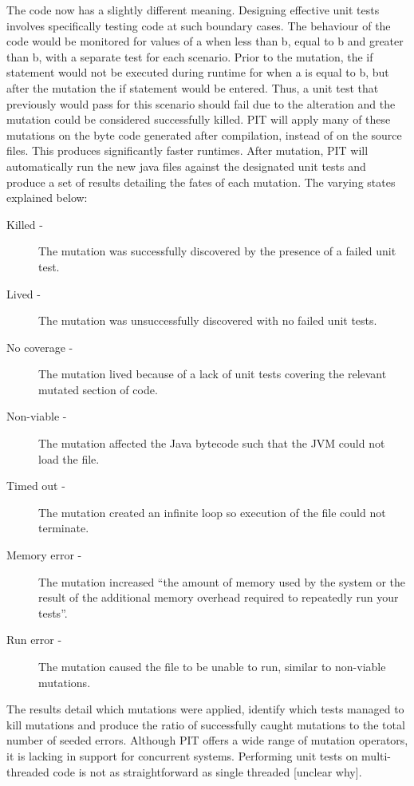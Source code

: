 \documentclass[a4paper,12pt]{article}
\begin{document}
The code now has a slightly different meaning. Designing effective unit tests involves specifically testing code at such boundary cases. The behaviour of the code would be monitored for values of a when less than b, equal to b and greater than b, with a separate test for each scenario. Prior to the mutation, the if statement would not be executed during runtime for when a is equal to b, but after the mutation the if statement would be entered. Thus, a unit test that previously would pass for this scenario should fail due to the alteration and the mutation could be considered successfully killed. PIT will apply many of these mutations on the byte code generated after compilation, instead of on the source files. This produces significantly faster runtimes. After mutation, PIT will automatically run the new java files against the designated unit tests and produce a set of results detailing the fates of each mutation. The varying states explained below:

\begin{description}
    \item[Killed - ]The mutation was successfully discovered by the presence of a failed unit test.
    \item[Lived -]The mutation was unsuccessfully discovered with no failed unit tests. 
    \item[No coverage -]The mutation lived because of a lack of unit tests covering the relevant mutated section of code. 
    \item[Non-viable -]The mutation affected the Java bytecode such that the JVM could not load the file.
    \item[Timed out -]The mutation created an infinite loop so execution of the file could not terminate. 
    \item[Memory error -]The mutation increased “the amount of memory used by the system or the result of the additional memory overhead required to repeatedly run your tests”.
    \item[Run error -]The mutation caused the file to be unable to run, similar to non-viable mutations.
\end{description}

The results detail which mutations were applied, identify which tests managed to kill mutations and produce the ratio of successfully caught mutations to the total number of seeded errors. Although PIT offers a wide range of mutation operators, it is lacking in support for concurrent systems. Performing unit tests on multi-threaded code is not as straightforward as single threaded [unclear why].
    
\end{document}
